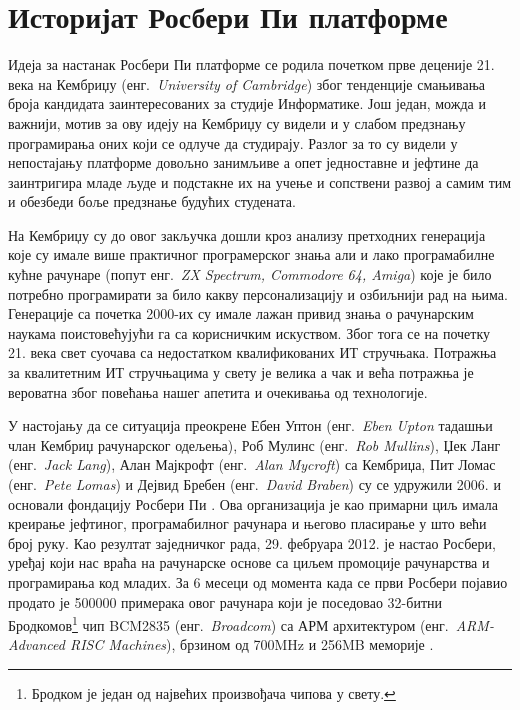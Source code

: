 \documentclass[12pt,oneside]{memoir}
\theoremstyle{remark}
\begin{document}
\section{Историјат Росбери Пи платформе }
Идеја за настанак Росбери Пи платформе се родила почетком прве деценије 21. века на Кембриџу (енг.~{\em University of Cambridge}) због тенденције смањивања броја кандидата заинтересованих за студије Информатике. Још један, можда и важнији, мотив за ову идеју на Кембриџу су видели и у слабом предзнању програмирања оних који се одлуче да студирају. Разлог за то су видели у непостајању платформе довољно занимљиве а опет једноставне и јефтине да заинтригира младе људе и подстакне их на учење и сопствени развој а самим тим и обезбеди боље предзнање будућих студената.

На Кембриџу су до овог закључка дошли кроз анализу претходних генерација које су имале више практичног програмерског знања али и лако програмабилне кућне рачунаре (попут енг.~{\em ZX Spectrum, Commodore 64, Amiga}) које је било потребно програмирати за било какву персонализацију и озбиљнији рад на њима. Генерације са почетка 2000-их су имале лажан привид знања о рачунарским наукама поистовећујући га са корисничким искуством. Због тога се на почетку 21. века свет суочава са недостатком квалификованих ИТ стручњака. Потражња за квалитетним ИТ стручњацима у свету је велика а чак и већа потражња је  вероватна због повећања нашег апетита и очекивања од технологије.

У настојању да се ситуација преокрене Ебен Уптон (енг.~{\em Eben Upton} тадашњи члан Кембриџ рачунарског одељења), Роб Мулинс (енг.~{\em Rob Mullins}), Џек Ланг (енг.~{\em Jack Lang}), Алан Мајкрофт (енг.~{\em Alan Mycroft}) са Кембриџа, Пит Ломас (енг.~{\em Pete Lomas}) и Дејвид Бребен (енг.~{\em David Braben}) су се удружили 2006. и основали фондацију Росбери Пи \cite{rpibook}. Ова организација је као примарни циљ имала креирање јефтиног, програмабилног рачунара и његово пласирање у што већи број руку. Као резултат заједничког рада, 29. фебруара 2012. је настао Росбери, уређај који нас враћа на рачунарске основе са циљем промоције рачунарства и програмирања код младих. За 6 месеци од момента када се први Росбери појавио продато је 500000 примерака овог рачунара који је поседовао 32-битни Бродкомов\footnote{Бродком је један од највећих произвођача чипова у свету.} чип BCM2835 (енг.~{\em Broadcom}) са АРМ архитектуром (енг.~{\em ARM-Advanced RISC Machines}), брзином од 700MHz и 256MB меморије \cite{rpibook}.
\end{document}
